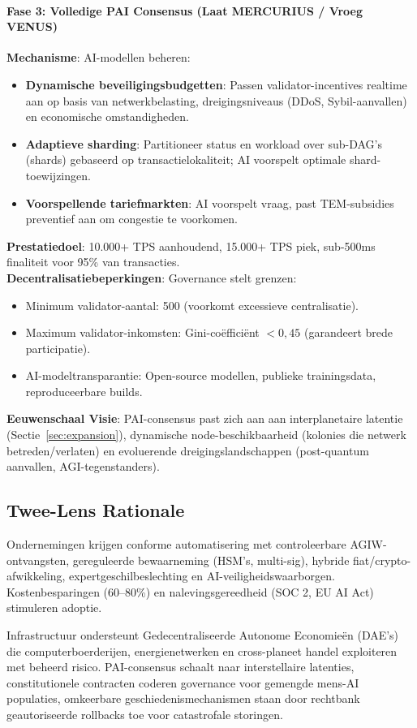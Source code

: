 \documentclass[11pt]{article}
\begin{document}
\paragraph{Fase 3: Volledige PAI Consensus (Laat MERCURIUS / Vroeg VENUS)}
\textbf{Mechanisme}: AI-modellen beheren:
\begin{itemize}[noitemsep]
  \item \textbf{Dynamische beveiligingsbudgetten}: Passen validator-incentives realtime aan op basis van netwerkbelasting, dreigingsniveaus (DDoS, Sybil-aanvallen) en economische omstandigheden.
  \item \textbf{Adaptieve sharding}: Partitioneer status en workload over sub-DAG's (shards) gebaseerd op transactielokaliteit; AI voorspelt optimale shard-toewijzingen.
  \item \textbf{Voorspellende tariefmarkten}: AI voorspelt vraag, past TEM-subsidies preventief aan om congestie te voorkomen.
\end{itemize}
\textbf{Prestatiedoel}: 10.000+ TPS aanhoudend, 15.000+ TPS piek, sub-500ms finaliteit voor 95\% van transacties.\\
\textbf{Decentralisatiebeperkingen}: Governance stelt grenzen:
\begin{itemize}[noitemsep]
  \item Minimum validator-aantal: 500 (voorkomt excessieve centralisatie).
  \item Maximum validator-inkomsten: Gini-coëfficiënt $<0,45$ (garandeert brede participatie).
  \item AI-modeltransparantie: Open-source modellen, publieke trainingsdata, reproduceerbare builds.
\end{itemize}
\textbf{Eeuwenschaal Visie}: PAI-consensus past zich aan aan interplanetaire latentie (Sectie~\ref{sec:expansion}), dynamische node-beschikbaarheid (kolonies die netwerk betreden/verlaten) en evoluerende dreigingslandschappen (post-quantum aanvallen, AGI-tegenstanders).

\subsection{Twee-Lens Rationale}
\begin{description}[style=nextline]
  \item[Korte Termijn (MERCURIUS-tijdperk)] Ondernemingen krijgen conforme automatisering met controleerbare AGIW-ontvangsten, gereguleerde bewaarneming (HSM's, multi-sig), hybride fiat/crypto-afwikkeling, expertgeschilbeslechting en AI-veiligheidswaarborgen. Kostenbesparingen (60--80\%) en nalevingsgereedheid (SOC 2, EU AI Act) stimuleren adoptie.
  \item[Eeuwenschaal (VENUS tot ANDROMEDA)] Infrastructuur ondersteunt Gedecentraliseerde Autonome Economieën (DAE's) die computerboerderijen, energienetwerken en cross-planeet handel exploiteren met beheerd risico. PAI-consensus schaalt naar interstellaire latenties, constitutionele contracten coderen governance voor gemengde mens-AI populaties, omkeerbare geschiedenismechanismen staan door rechtbank geautoriseerde rollbacks toe voor catastrofale storingen.
\end{description}
\end{document}
